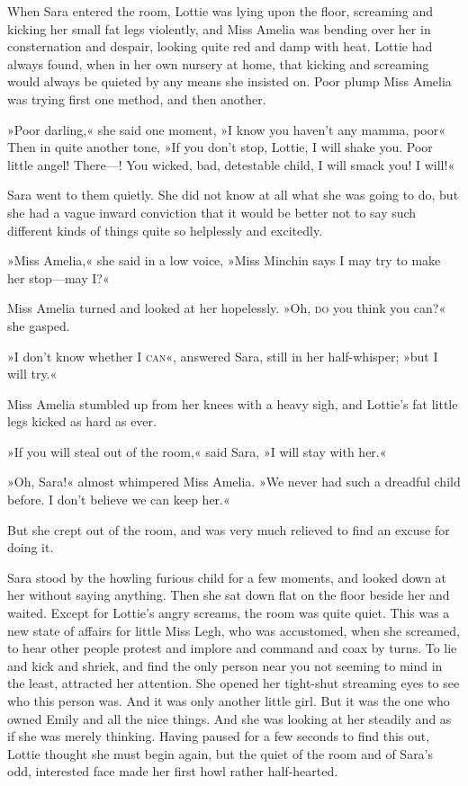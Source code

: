 When Sara entered the room, Lottie was lying upon the floor, screaming and kicking her small fat legs violently, and Miss Amelia was bending over her in consternation and despair, looking quite red and damp with heat. Lottie had always found, when in her own nursery at home, that kicking and screaming would always be quieted by any means she insisted on. Poor plump Miss Amelia was trying first one method, and then another.

»Poor darling,« she said one moment, »I know you haven't any mamma, poor\longdash« Then in quite another tone, »If you don't stop, Lottie, I will shake you. Poor little angel! There—! You wicked, bad, detestable child, I will smack you! I will!«

Sara went to them quietly. She did not know at all what she was going to do, but she had a vague inward conviction that it would be better not to say such different kinds of things quite so helplessly and excitedly.

»Miss Amelia,« she said in a low voice, »Miss Minchin says I may try to make her stop—may I?«

Miss Amelia turned and looked at her hopelessly. »Oh, \textsc{do} you think you can?« she gasped.

»I don't know whether I \textsc{can}«, answered Sara, still in her half-whisper; »but I will try.«

Miss Amelia stumbled up from her knees with a heavy sigh, and Lottie's fat little legs kicked as hard as ever.

»If you will steal out of the room,« said Sara, »I will stay with her.«

»Oh, Sara!« almost whimpered Miss Amelia. »We never had such a dreadful child before. I don't believe we can keep her.«

But she crept out of the room, and was very much relieved to find an excuse for doing it.

Sara stood by the howling furious child for a few moments, and looked down at her without saying anything. Then she sat down flat on the floor beside her and waited. Except for Lottie's angry screams, the room was quite quiet. This was a new state of affairs for little Miss Legh, who was accustomed, when she screamed, to hear other people protest and implore and command and coax by turns. To lie and kick and shriek, and find the only person near you not seeming to mind in the least, attracted her attention. She opened her tight-shut streaming eyes to see who this person was. And it was only another little girl. But it was the one who owned Emily and all the nice things. And she was looking at her steadily and as if she was merely thinking. Having paused for a few seconds to find this out, Lottie thought she must begin again, but the quiet of the room and of Sara's odd, interested face made her first howl rather half-hearted.

